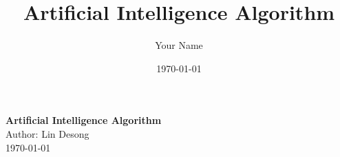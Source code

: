 \documentclass[12pt, twoside]{article}
\title{Artificial Intelligence Algorithm}
\author{Your Name}
\date{\today}
\begin{document}
\vspace*{5cm}

\begin{center}
    \Huge \textbf{Artificial Intelligence Algorithm} \\[5.5cm]
    \Large Author: Lin Desong \\[0.5cm] %
    \large \today
\end{center}

\newpage

\begin{spacing}{0.5} %
    \tableofcontents %
\end{spacing}

\newpage




% 





\end{document}
